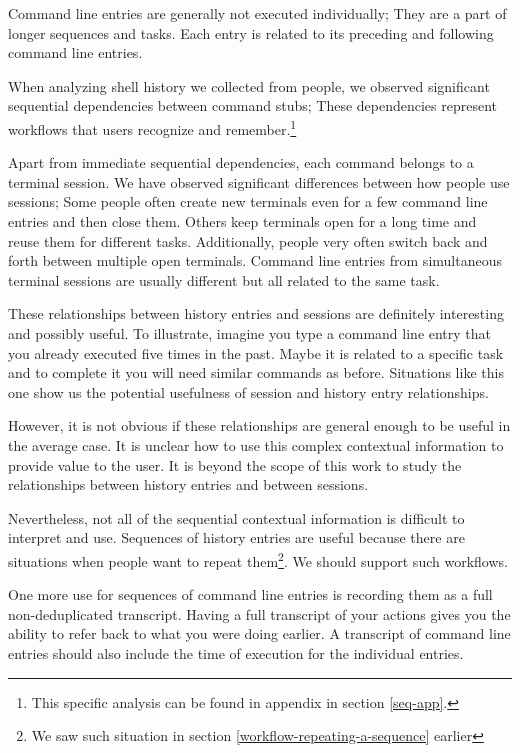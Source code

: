 Command line entries are generally not executed individually; They are a part of longer sequences and tasks.\cite{greenberg1993computer} Each entry is related to its preceding and following command line entries. 

When analyzing shell history we collected from people, we observed significant sequential dependencies between command stubs; These dependencies represent workflows that users recognize and remember.\footnote{This specific analysis can be found in appendix in section \ref{seq-app}.}

Apart from immediate sequential dependencies, each command belongs to a terminal session. We have observed significant differences between how people use sessions; Some people often create new terminals even for a few command line entries and then close them. Others keep terminals open for a long time and reuse them for different tasks.
Additionally, people very often switch back and forth between multiple open terminals. Command line entries from simultaneous terminal sessions are usually different but all related to the same task.

These relationships between history entries and sessions are definitely interesting and possibly useful. To illustrate, imagine you type a command line entry that you already executed five times in the past. Maybe it is related to a specific task and to complete it you will need similar commands as before. Situations like this one show us the potential usefulness of session and history entry relationships.

However, it is not obvious if these relationships are general enough to be useful in the average case. It is unclear how to use this complex contextual information to provide value to the user. It is beyond the scope of this work to study the relationships between history entries and between sessions.


Nevertheless, not all of the sequential contextual information is difficult to interpret and use. Sequences of history entries are useful because there are situations when people want to repeat them\footnote{We saw such situation in section \ref{workflow-repeating-a-sequence} earlier}. We should support such workflows.

One more use for sequences of command line entries is recording them as a full non-deduplicated transcript. Having a full transcript of your actions gives you the ability to refer back to what you were doing earlier. A transcript of command line entries should also include the time of execution for the individual entries.

